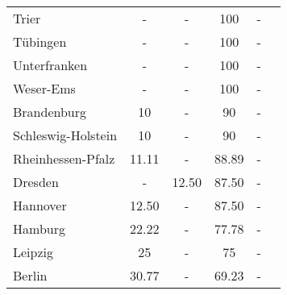 \begin{table}[H]
\begin{tabularx}{\textwidth}{Xccccc}
            Trier & - & - & 100 & - \\
            Tübingen & - & - & 100 & - \\
            Unterfranken & - & - & 100 & - \\
            Weser-Ems & - & - & 100 & - \\
            Brandenburg & 10 & - & 90 & - \\
            Schleswig-Holstein & 10 & - & 90 & - \\
            Rheinhessen-Pfalz & 11.11 & - & 88.89 & - \\
            Dresden & - & 12.50 & 87.50 & - \\
            Hannover & 12.50 & - & 87.50 & - \\
            Hamburg & 22.22 & - & 77.78 & - \\
            Leipzig & 25 & - & 75 & - \\
            Berlin & 30.77 & - & 69.23 & - \\
        \bottomrule
    \end{tabularx}
\end{table}
    